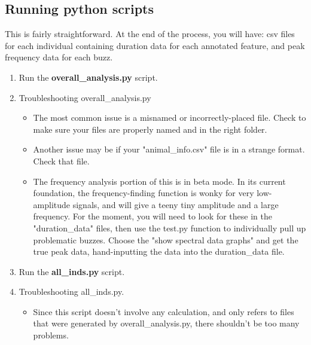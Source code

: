 \documentclass[11 pt]{article}
\begin{document}
\subsection{Running python scripts}
This is fairly straightforward.  At the end of the process, you will have: csv files for each individual containing duration data for each annotated feature, and peak frequency data for each buzz.
\begin{enumerate}
\item Run the {\bfseries overall\_analysis.py} script.
\item Troubleshooting overall\_analysis.py  
\begin{itemize}
\item The  most common issue is a misnamed or incorrectly-placed file.  Check to make sure your files are properly named and in the right folder.
\item Another issue may be if your "animal\_info.csv" file is in a strange format.  Check that file.
\item The frequency analysis portion of this is in beta mode.  In its current foundation, the frequency-finding function is wonky for very low-amplitude signals, and will give a teeny tiny amplitude and a large frequency.  For the moment, you will need to look for these in the "duration\_data" files, then use the test.py function to individually pull up problematic buzzes. Choose the "show spectral data graphs" and get the true peak data, hand-inputting the data into the duration\_data file.
\end{itemize}
\item Run the {\bfseries all\_inds.py} script.
\item Troubleshooting all\_inds.py.
\begin{itemize}
\item Since this script doesn't involve any calculation, and only refers to files that were generated by overall\_analysis.py, there shouldn't be too many problems.  
\end{itemize}
\end{enumerate}
\end{document}
